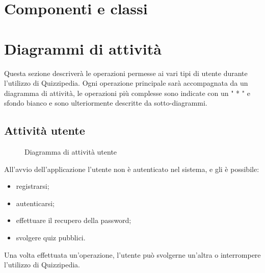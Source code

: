 \documentclass[a4paper, titlepage]{article}
\begin{document}
\section{Componenti e classi}


\newpage
\section{Diagrammi di attività}
Questa sezione descriverà le operazioni permesse ai vari tipi di utente durante l’utilizzo di Quizzipedia. Ogni operazione principale sarà accompagnata da un diagramma di attività, le operazioni più complesse sono indicate con un " * " e sfondo bianco e sono ulteriormente descritte da sotto-diagrammi.

\subsection{Attività utente}
\begin{figure}[H]
	\centering
	\noindent{}
	\caption{Diagramma di attività utente}
\end{figure}
All’avvio dell’applicazione l’utente non è autenticato nel sistema, e gli è possibile:
\begin{itemize}
	\item registrarsi;
	\item autenticarsi;
	\item effettuare il recupero della password;
	\item svolgere quiz pubblici.
\end{itemize}
Una volta effettuata un’operazione, l’utente può svolgerne un’altra o interrompere l’utilizzo di Quizzipedia.
\end{document}
